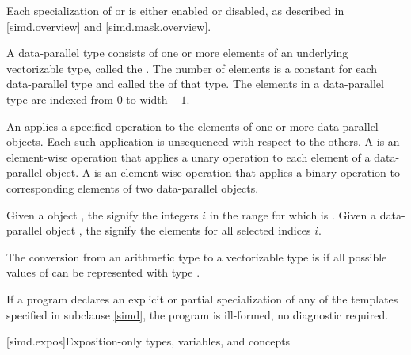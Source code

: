 \pnum
Each specialization of  or  is either
enabled or disabled, as described in \ref{simd.overview} and
\ref{simd.mask.overview}.

\pnum
A data-parallel type consists of one or more elements of an underlying
vectorizable type, called the .
The number of elements is a constant for each data-parallel type and called the
 of that type.
The elements in a data-parallel type are indexed from 0 to $\textrm{width} - 1$.

\pnum
An  applies a specified operation to the
elements of one or more data-parallel objects.
Each such application is unsequenced with respect to the others.
A  is an element-wise operation that
applies a unary operation to each element of a data-parallel object.
A  is an element-wise operation that
applies a binary operation to corresponding elements of two data-parallel
objects.

\pnum
Given a  object , the
 signify the integers $i$ in the range
 for which  is .
Given a data-parallel object , the 
signify the elements  for all selected indices $i$.

\pnum
The conversion from an arithmetic type  to a vectorizable type
 is  if all possible values of  can be
represented with type .

\pnum
If a program declares an explicit or partial specialization of
any of the templates specified in subclause \ref{simd},
the program is ill-formed, no diagnostic required.

[simd.expos]{Exposition-only types, variables, and concepts}

